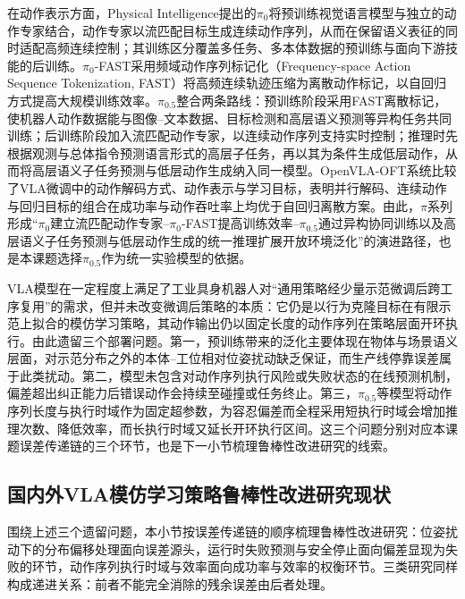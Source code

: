 在动作表示方面，Physical Intelligence提出的\(\pi_0\)将预训练视觉语言模型与独立的动作专家结合，动作专家以流匹配目标生成连续动作序列，从而在保留语义表征的同时适配高频连续控制；其训练区分覆盖多任务、多本体数据的预训练与面向下游技能的后训练\cite{black2024pi0}。\(\pi_0\)-FAST采用频域动作序列标记化（Frequency-space Action Sequence Tokenization, FAST）将高频连续轨迹压缩为离散动作标记，以自回归方式提高大规模训练效率\cite{pertsch2025fast}。\(\pi_{0.5}\)整合两条路线：预训练阶段采用FAST离散标记，使机器人动作数据能与图像--文本数据、目标检测和高层语义预测等异构任务共同训练；后训练阶段加入流匹配动作专家，以连续动作序列支持实时控制；推理时先根据观测与总体指令预测语言形式的高层子任务，再以其为条件生成低层动作，从而将高层语义子任务预测与低层动作生成纳入同一模型\cite{black2025pi05}。OpenVLA-OFT系统比较了VLA微调中的动作解码方式、动作表示与学习目标，表明并行解码、连续动作与回归目标的组合在成功率与动作吞吐率上均优于自回归离散方案\cite{kim2025openvlaoft}。由此，\(\pi\)系列形成“\(\pi_0\)建立流匹配动作专家--\(\pi_0\)-FAST提高训练效率--\(\pi_{0.5}\)通过异构协同训练以及高层语义子任务预测与低层动作生成的统一推理扩展开放环境泛化”的演进路径，也是本课题选择\(\pi_{0.5}\)作为统一实验模型的依据。

VLA模型在一定程度上满足了工业具身机器人对“通用策略经少量示范微调后跨工序复用”的需求，但并未改变微调后策略的本质：它仍是以行为克隆目标在有限示范上拟合的模仿学习策略，其动作输出仍以固定长度的动作序列在策略层面开环执行。由此遗留三个部署问题。第一，预训练带来的泛化主要体现在物体与场景语义层面，对示范分布之外的本体--工位相对位姿扰动缺乏保证，而生产线停靠误差属于此类扰动。第二，模型未包含对动作序列执行风险或失败状态的在线预测机制，偏差超出纠正能力后错误动作会持续至碰撞或任务终止。第三，\(\pi_{0.5}\)等模型将动作序列长度与执行时域作为固定超参数，为容忍偏差而全程采用短执行时域会增加推理次数、降低效率，而长执行时域又延长开环执行区间。这三个问题分别对应本课题误差传递链的三个环节，也是下一小节梳理鲁棒性改进研究的线索。

\subsection{国内外VLA模仿学习策略鲁棒性改进研究现状}

围绕上述三个遗留问题，本小节按误差传递链的顺序梳理鲁棒性改进研究：位姿扰动下的分布偏移处理面向误差源头，运行时失败预测与安全停止面向偏差显现为失败的环节，动作序列执行时域与效率面向成功率与效率的权衡环节。三类研究同样构成递进关系：前者不能完全消除的残余误差由后者处理。

